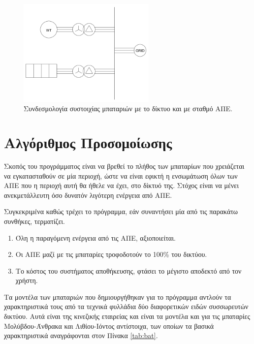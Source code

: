 \documentclass[12pt]{report}
\begin{document}
\begin{figure}[h]
				\center
				\includegraphics[width=0.6\textwidth]{gridbat}
				\captionsetup{width=0.8\textwidth}
				\caption{Συνδεσμολογία συστοιχίας μπαταριών με το δίκτυο και με σταθμό ΑΠΕ.}
				\label{fig:gridbat}
\end{figure}

\chapter{Αλγόριθμος Προσομοίωσης}
Σκοπός του προγράμματος είναι να βρεθεί το πλήθος των μπαταρίων που χρειάζεται να εγκατασταθούν σε μία περιοχή, ώστε να είναι εφικτή η ενσωμάτωση όλων των ΑΠΕ που η περιοχή αυτή θα ήθελε να έχει, στο δίκτυό της. Στόχος είναι 
να μένει ανεκμετάλλευτη όσο δυνατόν λιγότερη ενέργεια από ΑΠΕ. 

Συγκεκριμένα καθώς τρέχει το πρόγραμμα, εάν συναντήσει μία από τις παρακάτω συνθήκες, τερματίζει.

\begin{enumerate}[label=\roman*.]
				\item Όλη η παραγόμενη ενέργεια από τις ΑΠΕ, αξιοποιείται.
				\item Οι ΑΠΕ μαζί με τις μπαταρίες τροφοδοτούν το 100\% του δικτύου.
				\item Το κόστος του συστήματος αποθήκευσης, φτάσει το μέγιστο αποδεκτό από τον χρήστη.
\end{enumerate}

Τα μοντέλα των μπαταριών που δημιουργήθηκαν για το πρόγραμμα αντλούν τα χαρακτηριστικά τους από τα τεχνικά φυλλάδια δύο διαφορετικών ειδών συσσωρευτών δικτύου. Αυτά είναι της κινεζικής εταιρείας {} και
είναι τα μοντέλα {} και {} για τις μπαταρίες Μολύβδου-Άνθρακα και Λιθίου-Ιόντος αντίστοιχα, των οποίων τα βασικά χαρακτηριστικά αναγράφονται στον Πίνακα \ref{tab:bat}.
\end{document}
